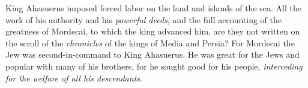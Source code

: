 \begin{biblechapter} %
 King Ahasuerus imposed forced labor on the land and islands of the sea.
\verse All the work of his authority and his \textit{powerful deeds}, and the full accounting of the greatness of Mordecai, to which the king advanced him, are they not written on the scroll of the \textit{chronicles} of the kings of Media and Persia?
\verse For Mordecai the Jew was second-in-command to King Ahasuerus. He was great for the Jews and popular with many of his brothers, for he sought good for his people, \textit{interceding for the welfare of all his descendants}.
\end{biblechapter}


